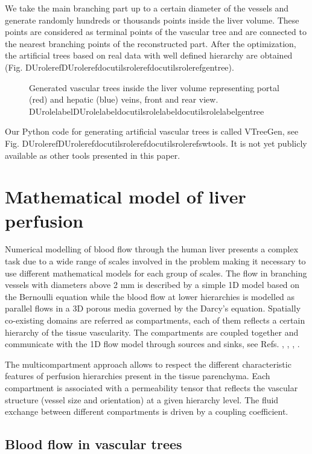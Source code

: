 \documentclass[letterpaper,compsoc,twoside]{IEEEtran}
\providecommand*{\DUrole}[2]{\ifcsname DUrole#1\endcsname \csname DUrole#1\endcsname{#2}\else \ifcsname docutilsrole#1\endcsname \csname docutilsrole#1\endcsname{#2}\else #2\fi \fi }
\begin{document}
We take the main branching part up to a certain diameter of the
vessels and generate randomly hundreds or thousands points inside the
liver volume. These points are considered as terminal points of the
vascular tree and are connected to the nearest branching points of the
reconstructed part. After the optimization, the artificial trees based
on real data with well defined hierarchy are obtained
(Fig. \DUrole{ref}{gentree}).\begin{figure}[]\noindent{}
\caption{Generated vascular trees inside the liver volume representing
portal (red) and hepatic (blue) veins, front and rear
view. \DUrole{label}{gentree}}
\end{figure}

Our Python code for generating artificial vascular trees is called
VTreeGen, see Fig. \DUrole{ref}{swtools}. It is not yet publicly available as
other tools presented in this paper.

\section{Mathematical model of liver perfusion\label{mathematical-model-of-liver-perfusion}}


Numerical modelling of blood flow through the human liver presents a
complex task due to a wide range of scales involved in the problem
making it necessary to use different mathematical models for each
group of scales. The flow in branching vessels with diameters above 2
mm is described by a simple 1D model based on the Bernoulli equation
while the blood flow at lower hierarchies is modelled as parallel
flows in a 3D porous media governed by the Darcy's equation. Spatially
co-existing domains are referred as compartments, each of them
reflects a certain hierarchy of the tissue vascularity. The
compartments are coupled together and communicate with the 1D flow
model through sources and sinks, see Refs. \cite{Roh12}, \cite{Roh12b},
\cite{Mic13}, \cite{Joa14}.

The multicompartment approach allows to respect the different
characteristic features of perfusion hierarchies present in the tissue
parenchyma. Each compartment is associated with a permeability tensor
that reflects the vascular structure (vessel size and orientation) at
a given hierarchy level. The fluid exchange between different
compartments is driven by a coupling coefficient.

\subsection{Blood flow in vascular trees\label{blood-flow-in-vascular-trees}}
\end{document}
